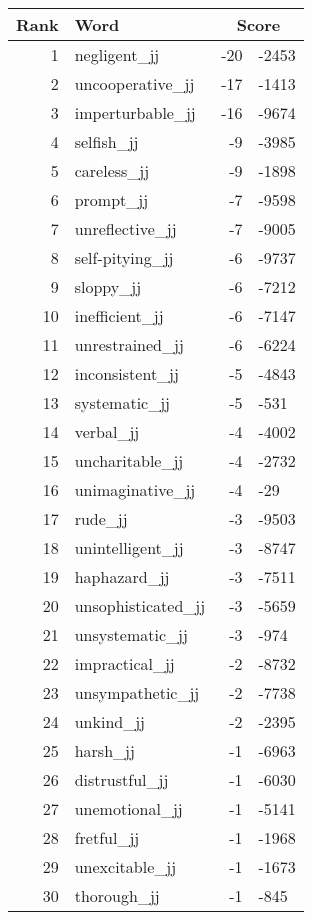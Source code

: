 \begin{longtable}[!htbp]{| rlr@{.}l |}
    \hline
    \textbf{Rank} & \textbf{Word} & \multicolumn{2}{c|}{\textbf{Score}} \\
    \hline
    \endhead
    1 & negligent\_jj & -20 & -2453 \\
    2 & uncooperative\_jj & -17 & -1413 \\
    3 & imperturbable\_jj & -16 & -9674 \\
    4 & selfish\_jj & -9 & -3985 \\
    5 & careless\_jj & -9 & -1898 \\
    6 & prompt\_jj & -7 & -9598 \\
    7 & unreflective\_jj & -7 & -9005 \\
    8 & self-pitying\_jj & -6 & -9737 \\
    9 & sloppy\_jj & -6 & -7212 \\
    10 & inefficient\_jj & -6 & -7147 \\
    11 & unrestrained\_jj & -6 & -6224 \\
    12 & inconsistent\_jj & -5 & -4843 \\
    13 & systematic\_jj & -5 & -531 \\
    14 & verbal\_jj & -4 & -4002 \\
    15 & uncharitable\_jj & -4 & -2732 \\
    16 & unimaginative\_jj & -4 & -29 \\
    17 & rude\_jj & -3 & -9503 \\
    18 & unintelligent\_jj & -3 & -8747 \\
    19 & haphazard\_jj & -3 & -7511 \\
    20 & unsophisticated\_jj & -3 & -5659 \\
    21 & unsystematic\_jj & -3 & -974 \\
    22 & impractical\_jj & -2 & -8732 \\
    23 & unsympathetic\_jj & -2 & -7738 \\
    24 & unkind\_jj & -2 & -2395 \\
    25 & harsh\_jj & -1 & -6963 \\
    26 & distrustful\_jj & -1 & -6030 \\
    27 & unemotional\_jj & -1 & -5141 \\
    28 & fretful\_jj & -1 & -1968 \\
    29 & unexcitable\_jj & -1 & -1673 \\
    30 & thorough\_jj & -1 & -845 \\

\end{longtable}
